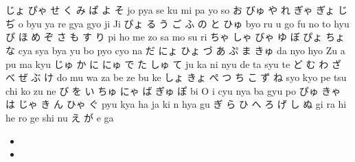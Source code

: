 \documentclass{article}
\begin{document}
\section{}

\subsection{}


じょ  ぴゃ  せ    く    み    ぱ    よ    そ
jo    pya   se    ku    mi    pa    yo    so    
お    びゅ  や    れ    ぎゃ  ぎょ  じ    ぢ    
o     byu   ya    re    gya   gyo   ji    Ji    
びょ  る    う    ご    ふ    の    と    ひゅ  
byo   ru    u     go    fu    no    to    hyu   
ぴ    ほ    め    ぞ    さ    も    す    り    
pi    ho    me    zo    sa    mo    su    ri    
ちゃ  しゃ  びゃ  ゆ    ぼ    ぴょ  ちょ  な    
cya   sya   bya   yu    bo    pyo   cyo   na    
だ    にょ  ひょ  づ    あ    ぷ    ま    きゅ  
da    nyo   hyo   Zu    a     pu    ma    kyu   
じゅ  か    に    にゅ  で    た    しゅ  て    
ju    ka    ni    nyu   de    ta    syu   te    
ど    む    わ    ざ    べ    ぜ    ぶ    け    
do    mu    wa    za    be    ze    bu    ke    
しょ  きょ  ぺ    つ    ち    こ    ず    ね    
syo   kyo   pe    tsu   chi   ko    zu    ne    
び    を    い    ちゅ  にゃ  ば    ぎゅ  ぽ    
bi    O     i     cyu   nya   ba    gyu   po    
ぴゅ  きゃ  は    じゃ  き    ん    ひゃ  ぐ    
pyu   kya   ha    ja    ki    n     hya   gu    
ぎ    ら    ひ    へ    ろ    げ    し    ぬ    
gi    ra    hi    he    ro    ge    shi   nu    
え    が    
e     ga 

\begin{itemize}
  \item
  \item
\end{itemize}
\end{document}
